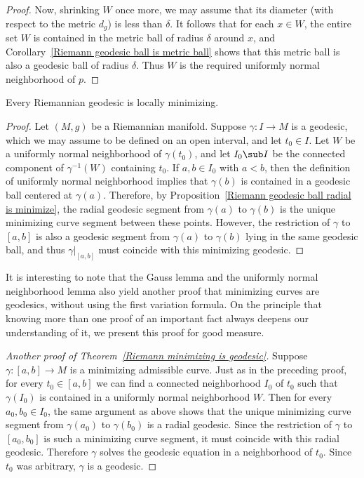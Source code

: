 \begin{proof}
Now, shrinking $W$ once more, we may assume that its diameter (with respect to the metric $d_g$) is less than $\delta$. It follows that for each $x\in W$, the entire 
set $W$ is contained in the metric ball of radius $\delta$ around $x$, and Corollary~\ref{Riemann geodesic ball is metric ball} shows that this metric ball is also a geodesic ball of radius $\delta$. Thus $W$ is the required uniformly normal neighborhood of $p$.
\end{proof}
\begin{theorem}\label{Riemann geodesic is local minimize}
Every Riemannian geodesic is locally minimizing.
\end{theorem}
\begin{proof}
Let $(M,g)$ be a Riemannian manifold. Suppose $\gamma:I\to M$ is a geodesic, which we may assume to be defined on an open interval, and let $t_0\in I$. Let $W$ be a 
uniformly normal neighborhood of $\gamma(t_0)$, and let $I_0\sub I$ be the connected component of $\gamma^{-1}(W)$ containing $t_0$. If $a,b\in I_0$ with $a<b$, then the 
definition of uniformly normal neighborhood implies that $\gamma(b)$ is contained in a geodesic ball centered at $\gamma(a)$. Therefore, by 
Proposition~\ref{Riemann geodesic ball radial is minimize}, the radial geodesic segment from $\gamma(a)$ to $\gamma(b)$ is the unique minimizing curve segment between these points. 
However, the restriction of $\gamma$ to $[a,b]$ is also a geodesic segment from $\gamma(a)$ to $\gamma(b)$ lying in the same geodesic ball, and thus $\gamma|_{[a,b]}$ must 
coincide with this minimizing geodesic.
\end{proof}
It is interesting to note that the Gauss lemma and the uniformly normal neighborhood lemma also yield another proof that minimizing curves are geodesics, without using 
the first variation formula. On the principle that knowing more than one proof of an important fact always deepens our understanding of it, we present this proof for 
good measure.
\begin{proof}[Another proof of Theorem~\ref{Riemann minimizing is geodesic}]
Suppose $\gamma:[a,b]\to M$ is a minimizing admissible curve. Just as in the preceding proof, for every $t_0\in[a,b]$ we can find a connected neighborhood $I_0$ of $t_0$ 
such that $\gamma(I_0)$ is contained in a uniformly normal neighborhood $W$. Then for every $a_0,b_0\in I_0$, the same argument as above shows that the unique minimizing 
curve segment from $\gamma(a_0)$ to $\gamma(b_0)$ is a radial geodesic. Since the restriction of $\gamma$ to $[a_0,b_0]$ is such a minimizing curve segment, it must 
coincide with this radial geodesic. Therefore $\gamma$ solves the geodesic equation in a neighborhood of $t_0$. Since $t_0$ was arbitrary, $\gamma$ is a geodesic.
\end{proof}
